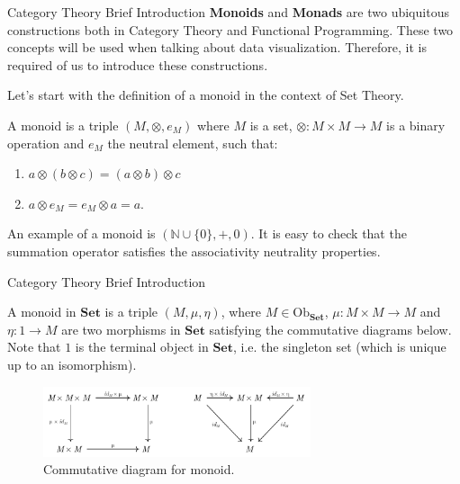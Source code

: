 \documentclass[aspectratio=169,xcolor=dvipsnames,10pt]{beamer}
\begin{document}
\begin{frame}[fragile]{Category Theory Brief Introduction}
	\textbf{Monoids} and \textbf{Monads} are two ubiquitous constructions both in Category Theory and
	Functional Programming. These two concepts will be used when talking about
	data visualization. Therefore, it is required of us to introduce these constructions.

	Let's start with the definition of a monoid in the context of Set Theory.

	\begin{definition}
		A monoid is a triple $(M, \otimes, e_M)$ where $M$ is a set, $\otimes:M\times M \to M$ is a binary operation
		and $e_M$ the neutral element, such that:
		\begin{enumerate}
			\item $a \otimes (b \otimes c) = (a \otimes b) \otimes c$
			\item $a \otimes e_M = e_M \otimes a = a$.
		\end{enumerate}
		\label{def:monoid}
	\end{definition}

	An example of a monoid is $(\mathbb N \cup \{0\}, +, 0)$.
	It is easy to check that the summation operator satisfies the
	associativity neutrality properties.
\end{frame}

\begin{frame}[fragile]{Category Theory Brief Introduction}
	\begin{definition}
		A monoid in $\mathbf{Set}$ is a triple $(M, \mu, \eta)$, where $M \in \text{Ob}_\mathbf{Set}$,
		$\mu:M \times M \to M$ and $\eta: 1 \to M$ are two morphisms in $\mathbf{Set}$ satisfying the
		commutative diagrams below. Note that $1$ is the terminal object in $\mathbf{Set}$, i.e.
		the singleton set (which is unique up to an isomorphism).

		\begin{figure}[H]
			\begin{center}
				\includegraphics[width=0.7\textwidth]{./figs/MonoidalCategory.pdf}
			\end{center}
			\caption{Commutative diagram for monoid.}
			\label{fig:monoid-diagram}
		\end{figure}
		\label{def:monoid-cat}
	\end{definition}
\end{frame}
\end{document}
